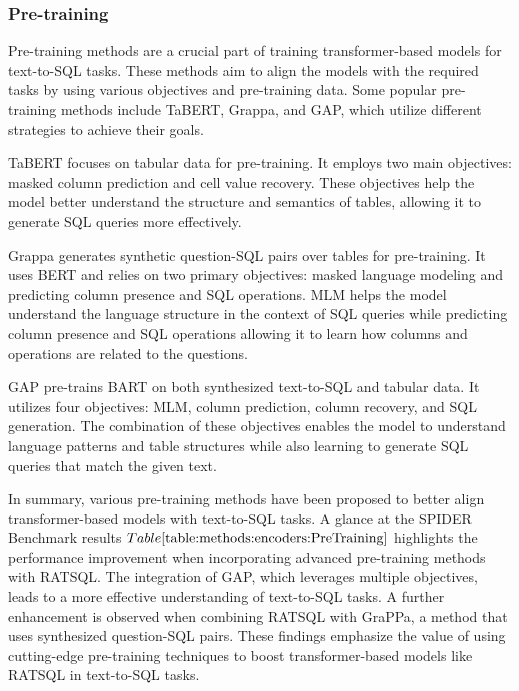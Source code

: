 \subsubsection{Pre-training}

Pre-training methods are a crucial part of training transformer-based models for text-to-SQL tasks. These methods aim to align the models with the required tasks by using various objectives and pre-training data. Some popular pre-training methods include TaBERT\cite{yin_tabert_2020}, Grappa\cite{DBLP:journals/corr/abs-2009-13845}, and GAP\cite{shi2020learning}, which utilize different strategies to achieve their goals.

TaBERT \cite{yin_tabert_2020} focuses on tabular data for pre-training. It employs two main objectives: masked column prediction and cell value recovery. These objectives help the model better understand the structure and semantics of tables, allowing it to generate SQL queries more effectively.

Grappa \cite{DBLP:journals/corr/abs-2009-13845} generates synthetic question-SQL pairs over tables for pre-training. It uses BERT and relies on two primary objectives: masked language modeling and predicting column presence and SQL operations. \ac{MLM} helps the model understand the language structure in the context of SQL queries while predicting column presence and SQL operations allowing it to learn how columns and operations are related to the questions.

GAP \cite{shi2020learning} pre-trains BART \cite{lewis-etal-2020-bart} on both synthesized text-to-SQL and tabular data. It utilizes four objectives: MLM, column prediction, column recovery, and SQL generation. The combination of these objectives enables the model to understand language patterns and table structures while also learning to generate SQL queries that match the given text.

In summary, various pre-training methods have been proposed to better align transformer-based models with text-to-SQL tasks. A glance at the SPIDER Benchmark results \(Table\ref{table:methods:encoders:PreTraining}\) highlights the performance improvement when incorporating advanced pre-training methods with RATSQL. The integration of GAP, which leverages multiple objectives, leads to a more effective understanding of text-to-SQL tasks. A further enhancement is observed when combining RATSQL with GraPPa, a method that uses synthesized question-SQL pairs. These findings emphasize the value of using cutting-edge pre-training techniques to boost transformer-based models like RATSQL in text-to-SQL tasks.

